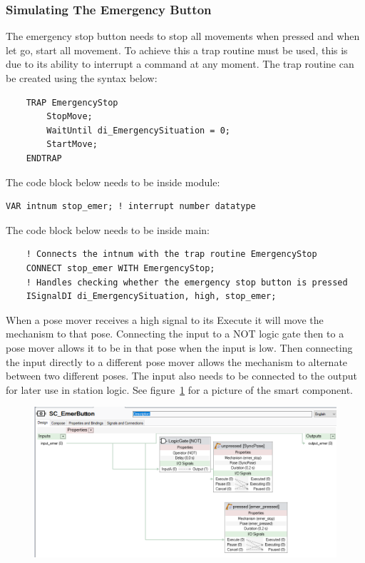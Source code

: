 \documentclass[a4paper,12pt]{article}
\begin{document}
\subsubsection{Simulating The Emergency Button}
The emergency stop button needs to stop all movements when pressed and when let go, start all movement. To achieve this a trap routine must be used, this is due to its ability to interrupt a command at any moment. The trap routine can be created using the syntax below:
\begin{lstlisting}
    TRAP EmergencyStop
        StopMove;
        WaitUntil di_EmergencySituation = 0;
        StartMove;
    ENDTRAP
\end{lstlisting}
The code block below needs to be inside module: 
\begin{lstlisting}
VAR intnum stop_emer; ! interrupt number datatype
\end{lstlisting}
The code block below needs to be inside main:
\begin{lstlisting}
    ! Connects the intnum with the trap routine EmergencyStop
    CONNECT stop_emer WITH EmergencyStop;
    ! Handles checking whether the emergency stop button is pressed
    ISignalDI di_EmergencySituation, high, stop_emer;
\end{lstlisting}
When a pose mover receives a high signal to its Execute it will move the mechanism to that pose. Connecting the input to a NOT logic gate then to a pose mover allows it to be in that pose when the input is low. Then connecting the input directly to a different pose mover allows the mechanism to alternate between two different poses. The input also needs to be connected to the output for later use in station logic. See figure~\ref{fig:smart_component_emer} for a picture of the smart component.

\begin{figure}
    \centering
    \includegraphics[width=1\linewidth]{SC_emer_button.png}
    \captionsetup{font=scriptsize}
    \label{fig:smart_component_emer}
\end{figure}
\end{document}
